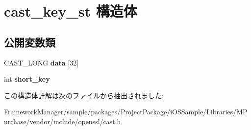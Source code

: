 \hypertarget{structcast__key__st}{}\section{cast\+\_\+key\+\_\+st 構造体}
\label{structcast__key__st}
\subsection*{公開変数類}
\begin{DoxyCompactItemize}
\item 
\hypertarget{structcast__key__st_a016e1aa6521740a3a438bc04b2c78014}{}C\+A\+S\+T\+\_\+\+L\+O\+N\+G {\bfseries data} \mbox{[}32\mbox{]}\label{structcast__key__st_a016e1aa6521740a3a438bc04b2c78014}

\item 
\hypertarget{structcast__key__st_a34043464743188eea278cc583540db15}{}int {\bfseries short\+\_\+key}\label{structcast__key__st_a34043464743188eea278cc583540db15}

\end{DoxyCompactItemize}


この構造体詳解は次のファイルから抽出されました\+:\begin{DoxyCompactItemize}
\item 
Framework\+Manager/sample/packages/\+Project\+Package/i\+O\+S\+Sample/\+Libraries/\+M\+Purchase/vendor/include/openssl/cast.\+h\end{DoxyCompactItemize}
